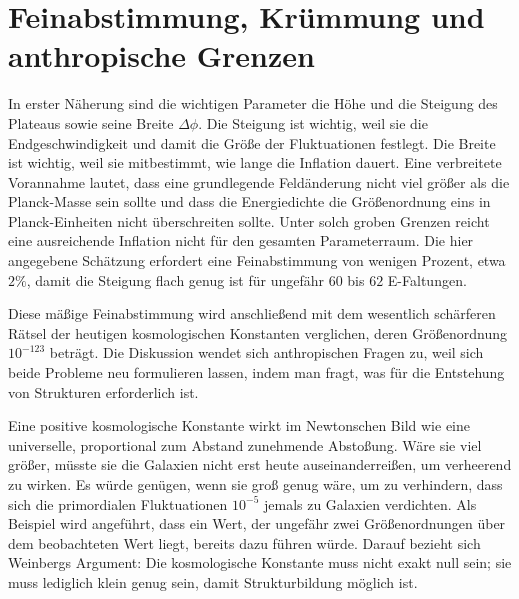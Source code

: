 \section{Feinabstimmung, Krümmung und anthropische Grenzen}

In erster Näherung sind die wichtigen Parameter die Höhe und die Steigung des Plateaus sowie seine Breite \(\Delta\phi\). Die Steigung ist wichtig, weil sie die Endgeschwindigkeit und damit die Größe der Fluktuationen festlegt. Die Breite ist wichtig, weil sie mitbestimmt, wie lange die Inflation dauert. Eine verbreitete Vorannahme lautet, dass eine grundlegende Feldänderung nicht viel größer als die Planck-Masse sein sollte und dass die Energiedichte die Größenordnung eins in Planck-Einheiten nicht überschreiten sollte. Unter solch groben Grenzen reicht eine ausreichende Inflation nicht für den gesamten Parameterraum. Die hier angegebene Schätzung erfordert eine Feinabstimmung von wenigen Prozent, etwa \(2\%\), damit die Steigung flach genug ist für ungefähr \(60\) bis \(62\) E-Faltungen.

\begin{classroomqa}
\end{classroomqa}

Diese mäßige Feinabstimmung wird anschließend mit dem wesentlich schärferen Rätsel der heutigen kosmologischen Konstanten verglichen, deren Größenordnung \(10^{-123}\) beträgt. Die Diskussion wendet sich anthropischen Fragen zu, weil sich beide Probleme neu formulieren lassen, indem man fragt, was für die Entstehung von Strukturen erforderlich ist.

Eine positive kosmologische Konstante wirkt im Newtonschen Bild wie eine universelle, proportional zum Abstand zunehmende Abstoßung. Wäre sie viel größer, müsste sie die Galaxien nicht erst heute auseinanderreißen, um verheerend zu wirken. Es würde genügen, wenn sie groß genug wäre, um zu verhindern, dass sich die primordialen Fluktuationen \(10^{-5}\) jemals zu Galaxien verdichten. Als Beispiel wird angeführt, dass ein Wert, der ungefähr zwei Größenordnungen über dem beobachteten Wert liegt, bereits dazu führen würde. Darauf bezieht sich Weinbergs Argument: Die kosmologische Konstante muss nicht exakt null sein; sie muss lediglich klein genug sein, damit Strukturbildung möglich ist.

